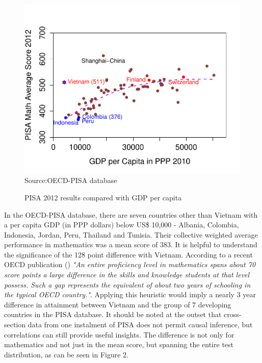 \documentclass[12pt]{article}%
\begin{document}
\begin{figure}[H]
   \caption{PISA 2012 results compared with GDP per capita}
   \centering 
     \includegraphics[width=0.75 \textwidth]{INTRFIG1.pdf} \\
\scriptsize{Source:OECD-PISA database        \hspace{3in}     }
   \label{Figure 1} 
\end{figure}

In the OECD-PISA database, there are seven countries other than Vietnam with a per capita GDP (in PPP dollars) below US\$ 10,000 - Albania, Colombia, Indonesia, Jordan, Peru, Thailand and Tunisia.  Their collective weighted average performance in mathematics was a mean score of 383. It is helpful to understand the significance of the 128 point difference with Vietnam. According to a recent OECD publication (\cite{OECD2013a}) \emph{"An entire proficiency level in mathematics spans about 70 score points \textendash  
a large difference in the skills and
knowledge students at that level possess. Such a gap represents the equivalent of about two years of schooling in the typical OECD country."}. Applying this heuristic would imply a nearly 3 year difference in attainment between Vietnam and the group of 7 developing countries in the PISA database. It should be noted at the outset that cross-section data from one instalment of PISA does not permit causal inference, but correlations can still provide useful insights. The difference is not only for mathematics and not just in the mean score, but spanning the entire test distribution, as can be seen in Figure 2. 
\end{document}
